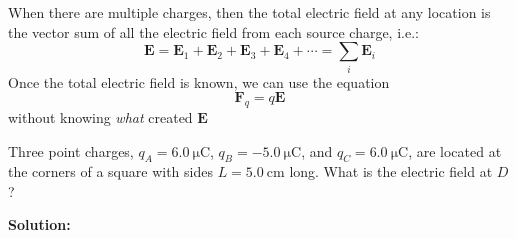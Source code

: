 When there are multiple charges, then the total electric field at any
location is the vector sum of all the electric field from each source
charge, i.e.:
\begin{equation}
  \bm E=\bm E_1+\bm E_2+\bm E_3+\bm E_4+\cdots=\sum_i \bm E_i
\end{equation}
Once the total electric field is known, we can use the equation
\begin{equation*}
  \bm F_q=q\bm E
\end{equation*}
without knowing \emph{what} created $\bm E$



%  
%


\begin{example}
  Three point charges, $q_A=\SI{6.0}{\micro\coulomb}$,
  $q_B=\SI{-5.0}{\micro\coulomb}$, and $q_C=\SI{6.0}{\micro\coulomb}$, are
  located at the corners of a square with sides $L=\SI{5.0}{\centi\metre}$ long.
  What is the electric field at $D$?%
  \begin{center}
    \vspace{-.2in}
  \end{center}
  \textbf{Solution:}
\end{example}
